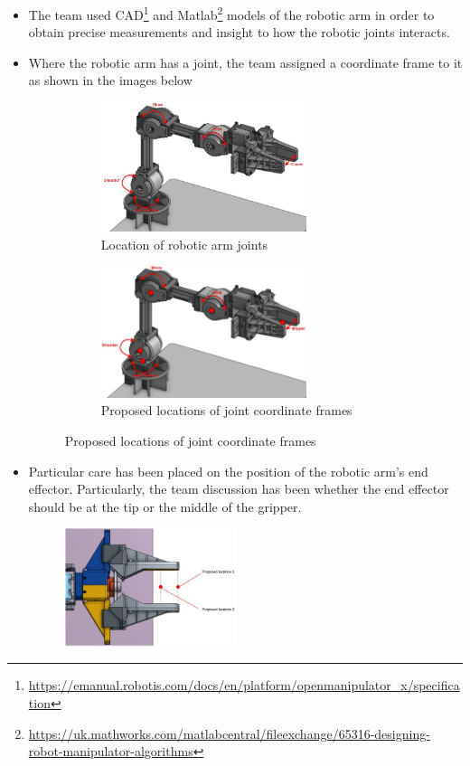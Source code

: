\documentclass[10pt, a4paper]{article}
\begin{document}
\begin{itemize}
    \item The team used
    CAD\footnote{\url{https://emanual.robotis.com/docs/en/platform/openmanipulator_x/specification}} 
    and
    Matlab\footnote{\url{https://uk.mathworks.com/matlabcentral/fileexchange/65316-designing-robot-manipulator-algorithms}}
    models of the robotic arm in order to obtain precise measurements
    and insight to how the robotic joints interacts.

    \item Where the robotic arm has a joint, the team assigned a coordinate
    frame to it as shown in the images below 
    \begin{figure}[h!]
      \centering
      \begin{subfigure}{.5\textwidth}
        \centering
        \includegraphics[width=6cm]{Arm Servo Joints.JPG}
        \caption{Location of robotic arm joints}
      \end{subfigure}%
      \begin{subfigure}{.5\textwidth}
        \centering
        \includegraphics[width=6cm]{Arm Servo Joint with frames.JPG}
        \caption{Proposed locations of joint coordinate frames}
      \end{subfigure}
  \end{figure}
  
    
    \item Particular care has been placed on the position of the robotic arm's
    end effector. Particularly, the team discussion has been whether the end
    effector should be at the tip or the middle of the gripper.
    \begin{figure}[h]
        \centering
        \includegraphics[width=5cm]{Effector location.JPG}
    \end{figure}
\end{itemize} 
\end{document}
